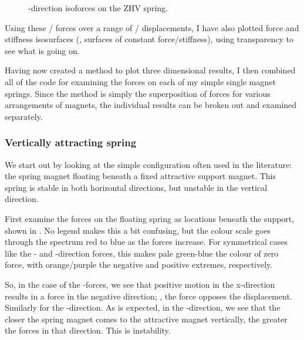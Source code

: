 \documentclass[11pt,a4paper]{memoir}
\begin{document}
\begin{figure}
   \centering
   \caption{\x-direction isoforces on the ZHV spring.}
\end{figure}

Using these \threeD/ forces over a range of \threeD/ displacements, I have
also plotted force and stiffness isosurfaces (\ie, surfaces of constant
force/stiffness), using transparency to see what is going on.

Having now created a method to plot three dimensional results, I then combined
all of the code for examining the forces on each of my simple single magnet
springs. Since the method is simply the superposition of forces for various
arrangements of magnets, the individual results can be broken out and examined
separately.

\subsubsection{Vertically attracting spring}

We start out by looking at the simple configuration often used in the
literature: the spring magnet floating beneath a fixed attractive support
magnet. This spring is stable in both horizontal directions, but unstable in
the vertical direction.

First examine the forces on the floating spring as locations beneath the
support, shown in . No legend makes this a bit confusing,
but the colour scale goes through the spectrum red to blue as the forces
increase. For symmetrical cases like the \x- and \y-direction forces, this
makes pale green-blue the colour of zero force, with orange/purple the
negative and positive extremes, respectively.

So, in the case of the \x-forces, we see that positive motion in the
x-direction results in a force in the negative direction; \ie, the force
opposes the displacement. Similarly for the \y-direction. As is expected, in
the \z-direction, we see that the closer the spring magnet comes to the
attractive magnet vertically, the greater the forces in that direction. This
is instability.
\end{document}
